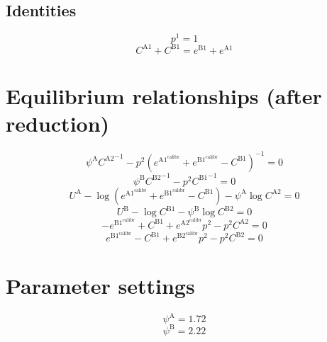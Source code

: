 \subsection{Identities}

\begin{equation}
p^{\mathrm{1}} = 1
\end{equation}
\begin{equation}
C^{\mathrm{A1}} + C^{\mathrm{B1}} = e^{\mathrm{B1}} + e^{\mathrm{A1}}
\end{equation}




\section{Equilibrium relationships (after reduction)}

\begin{equation}
{\psi^{\mathrm{A}}} {C^{\mathrm{A2}}}^{-1} - {p^{\mathrm{2}}} \left(e^{\mathrm{A1}^{\mathrm{calibr}}} + e^{\mathrm{B1}^{\mathrm{calibr}}} - C^{\mathrm{B1}}\right)^{-1} = 0
\end{equation}
\begin{equation}
{\psi^{\mathrm{B}}} {C^{\mathrm{B2}}}^{-1} - {p^{\mathrm{2}}} {C^{\mathrm{B1}}}^{-1} = 0
\end{equation}
\begin{equation}
U^{\mathrm{A}} - \log\left(e^{\mathrm{A1}^{\mathrm{calibr}}} + e^{\mathrm{B1}^{\mathrm{calibr}}} - C^{\mathrm{B1}}\right) - {\psi^{\mathrm{A}}} {\log{C^{\mathrm{A2}}}} = 0
\end{equation}
\begin{equation}
U^{\mathrm{B}} - \log{C^{\mathrm{B1}}} - {\psi^{\mathrm{B}}} {\log{C^{\mathrm{B2}}}} = 0
\end{equation}
\begin{equation}
-e^{\mathrm{B1}^{\mathrm{calibr}}} + C^{\mathrm{B1}} + {e^{\mathrm{A2}^{\mathrm{calibr}}}} {p^{\mathrm{2}}} - {p^{\mathrm{2}}} {C^{\mathrm{A2}}} = 0
\end{equation}
\begin{equation}
e^{\mathrm{B1}^{\mathrm{calibr}}} - C^{\mathrm{B1}} + {e^{\mathrm{B2}^{\mathrm{calibr}}}} {p^{\mathrm{2}}} - {p^{\mathrm{2}}} {C^{\mathrm{B2}}} = 0
\end{equation}






\section{Parameter settings}

\begin{equation}
\psi^{\mathrm{A}} = 1.72
\end{equation}
\begin{equation}
\psi^{\mathrm{B}} = 2.22
\end{equation}


